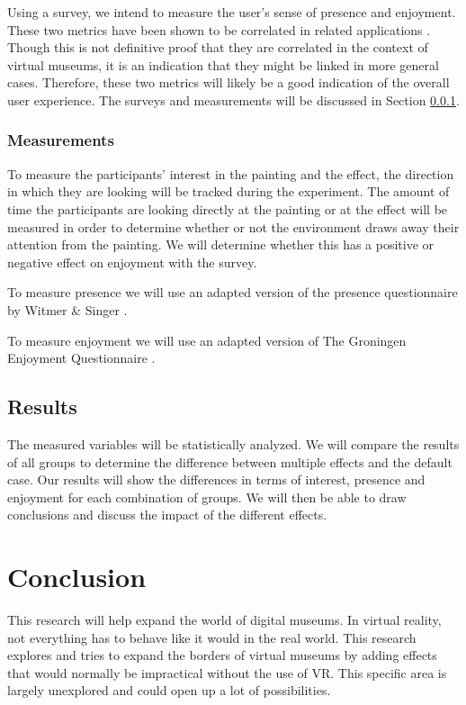 \documentclass[a4paper]{article}
\begin{document}
Using a survey, we intend to measure the user's sense of presence and enjoyment. These two metrics have been shown to be correlated in related applications \cite{sylaiou}. Though this is not definitive proof that they are correlated in the context of virtual museums, it is an indication that they might be linked in more general cases. Therefore, these two metrics will likely be a good indication of the overall user experience. The surveys and measurements will be discussed in Section \ref{sec:measurements}.

\subsubsection{Measurements}\label{sec:measurements}

To measure the participants' interest in the painting and the effect, the direction in which they are looking will be tracked during the experiment. The amount of time the participants are looking directly at the painting or at the effect will be measured in order to determine whether or not the environment draws away their attention from the painting. We will determine whether this has a positive or negative effect on enjoyment with the survey.

To measure presence we will use an adapted version of the presence questionnaire by Witmer \& Singer \cite{witmer}.

To measure enjoyment we will use an adapted version of The Groningen Enjoyment Questionnaire \cite{stevens}.

\subsection{Results}

The measured variables will be statistically analyzed. We will compare the results of all groups to determine the difference between multiple effects and the default case. Our results will show the differences in terms of interest, presence and enjoyment for each combination of groups. We will then be able to draw conclusions and discuss the impact of the different effects.


\section {Conclusion}
This research will help expand the world of digital museums. In virtual reality, not everything has to behave like it would in the real world. This research explores and tries to expand the borders of virtual museums by adding effects that would normally be impractical without the use of VR. This specific area is largely unexplored and could open up a lot of possibilities.
\end{document}
